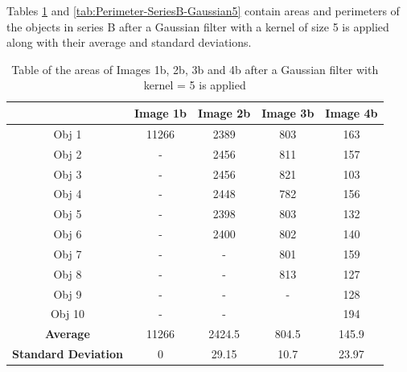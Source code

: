 \documentclass[runningheads]{llncs}
\begin{document}
\newpage
Tables \ref{tab:Area-SeriesB-Gaussian5} and \ref{tab:Perimeter-SeriesB-Gaussian5} contain areas and perimeters of the objects in series B after a Gaussian filter with a kernel of size 5 is applied along with their average and standard deviations.
\begin{table}[h!]
\centering
\begin{tabular}{|c|c|c|c|c|}
\hline
\textbf{} & \textbf{Image 1b} & \textbf{Image 2b} & \textbf{Image 3b} & \textbf{Image 4b} \\
\hline
Obj 1 & 11266      & 2389  & 803 &  163 \\ \hline
Obj 2 &    -        & 2456  & 811 &  157\\ \hline
Obj 3 &   -         & 2456  & 821 &  103\\ \hline
Obj 4 &    -        & 2448  & 782 &  156\\ \hline
Obj 5 &    -        & 2398  & 803 &  132\\ \hline
Obj 6 &   -         & 2400  & 802 &  140\\ \hline
Obj 7 &   -         &   -    & 801 &  159\\ \hline
Obj 8 &   -         &   -    & 813 &  127 \\ \hline
Obj 9 &   -         &   -    &  -    & 128\\ \hline
Obj 10 &  -          &  -     &      & 194\\ \hline
\textbf{Average} &   11266    &  2424.5      &   804.5    & 145.9  \\ \hline
\textbf{Standard Deviation} &  0      &  29.15      &    10.7   & 23.97  \\ \hline
\end{tabular}
\caption{Table of the areas of Images 1b, 2b, 3b and 4b after a Gaussian filter with kernel = 5 is applied}
\label{tab:Area-SeriesB-Gaussian5}
\end{table}
\end{document}

